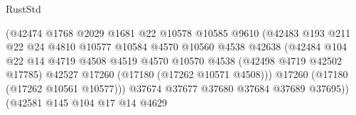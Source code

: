 \begin{lexlean}{RustStd}
\begin{coremodule}
                                            (@42474
                                              @1768
                                              @2029
                                              @1681
                                              @22
                                              @10578
                                              @10585
                                              @9610
                                              (@42483
                                                @193
                                                @211
                                                @22
                                                @24
                                                @4810
                                                @10577
                                                @10584
                                                @4570
                                                @10560
                                                @4538
                                                @42638
                                                (@42484
                                                  @104
                                                  @22
                                                  @14
                                                  @4719
                                                  @4508
                                                  @4519
                                                  @4570
                                                  @10570
                                                  @4538
                                                  (@42498 @4719 @42502 @17785)
                                                  @42527
                                                  @17260
                                                  (@17180 (@17262 @10571 @4508)))
                                                @17260
                                                (@17180 (@17262 @10561 @10577)))
                                              @37674
                                              @37677
                                              @37680
                                              @37684
                                              @37689
                                              @37695))
                                          (@42581
                                            @145
                                            @104
                                            @17
                                            @14
                                            @4629

\end{coremodule}
\end{lexlean}
